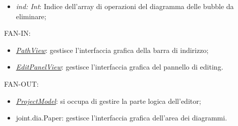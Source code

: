 \documentclass[../DefinizioneDiProdotto.tex]{subfiles}
\begin{document}
\begin{itemize}
\begin{itemize}
\begin{itemize}
								\item \emph{ind: Int}: Indice dell'array di operazioni del diagramma delle bubble da eliminare;
							\end{itemize}
						\end{itemize}
						FAN-IN:
						\begin{itemize}
							\item \hyperlink{SWEDesigner::View::PathView}{\emph{PathView}}: gestisce l'interfaccia grafica della barra di indirizzo;
							\item \hyperlink{SWEDesigner::View::EditPanelView}{\emph{EditPanelView}}: gestisce l'interfaccia grafica del pannello di editing.
						\end{itemize}
						FAN-OUT:
						\begin{itemize}
							\item \hyperlink{SWEDesigner::Model::ProjectModel}{\emph{ProjectModel}}: si occupa di gestire la parte logica dell'editor;
							\item joint.dia.Paper: gestisce l'interfaccia grafica dell'area dei diagrammi.
						\end{itemize}
					\end{itemize}
					
\end{document}
